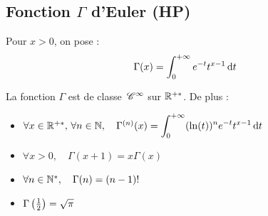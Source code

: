 \subsection{\texorpdfstring{Fonction $\Gamma$ d'Euler (HP)}{Fonction Gamma d'Euler (HP)}}

\begin{definitionnt}{}{}
    Pour $x > 0$, on pose :
    \[ \Gamma(x) = \int_0^{+\infty} e^{-t} t^{x-1} \,\mathrm{d}t \]
\end{definitionnt}


\begin{theorement}{}{}
    La fonction $\Gamma$ est de classe $\,\mathscr C^{\infty}$ sur $\mathbb{R}^{+*}$. De plus :
    \begin{itemize}
        \item $\forall x \in \mathbb{R}^{+*}, \, \forall n \in \mathbb{N}, \quad \Gamma^{(n)}(x) = \displaystyle\int_0^{+\infty} (\ln(t))^n e^{-t} t^{x-1} \,\mathrm{d}t$
        \item $\forall x > 0, \quad \Gamma(x+1) = x \Gamma(x)$
        \item $\forall n \in \mathbb{N}^*, \quad \Gamma(n) = (n-1)!$
        \item $\Gamma\left(\frac{1}{2}\right) = \sqrt{\pi}$
    \end{itemize}
\end{theorement}

